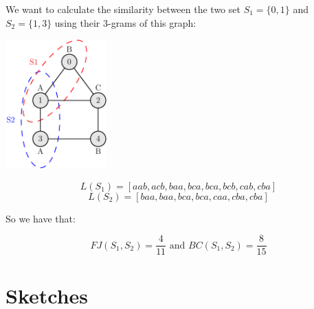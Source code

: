 \begin{esempio}
	We want to calculate the similarity between the two set $S_{1} = \{0,1\}$ and $S_{2} = \{1, 3\}$ using their $3$-grams of this graph:
		
	
	\begin{minipage}[t]{1\textwidth}
	\centering
	\includegraphics[width=3.9cm,height=5cm]{figure/figure-2-1}
	\end{minipage}\hfill

	\begin{equation*}
		L(S_{1}) = [aab, acb, baa, bca, bca, bcb, cab, cba]
	\end{equation*}
	\begin{equation*}
		L(S_{2}) = [baa, baa, bca, bca, caa, cba, cba]
	\end{equation*}
	
	
		
	So we have that:
	
	\begin{equation*}
		FJ(S_{1}, S_{2}) = \frac{4}{11} \text{  and  } BC(S_{1}, S_{2}) = \frac{8}{15}
	\end{equation*}
	
\end{esempio}


\section{Sketches}

